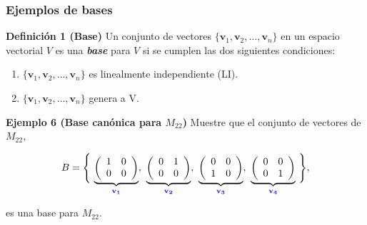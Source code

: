 {\nologo
\begin{frame}\frametitle{Ejemplos de bases}

\begin{block}{\textbf{Definición 1 (Base)}}
	\justifying
	Un conjunto de vectores $\{\mathbf{v}_1, \mathbf{v}_2, \hdots , \mathbf{v}_n \}$ en un espacio vectorial $V$ es 
	una \textbf{\textit{base}} para $V$ si se cumplen las dos siguientes condiciones:
	\begin{enumerate}
		\item[\labelname{$a$}] $\{\mathbf{v}_1, \mathbf{v}_2, \hdots , \mathbf{v}_n \}$ es linealmente independiente (LI).
		\item[\labelname{$b$}] $\{\mathbf{v}_1, \mathbf{v}_2, \hdots , \mathbf{v}_n \}$ genera a V.
	\end{enumerate}
\end{block}


\begin{ej}{\textbf{Ejemplo 6 (Base canónica para $M_{22}$)}} \justifying
	Muestre que el conjunto de vectores de $M_{22}$,
	
	\vspace{-2mm}
	\[
	B = \Bigg\{ \, \underbrace{ \left( \begin{array}{cc}	1 & 0 \\ 0 & 0 \end{array} \right) }_{\color{blue}\mathbf{v_1}}, \ \underbrace{  \left( \begin{array}{cc}	0 & 1 \\ 0 & 0 \end{array} \right) }_{\color{blue}\mathbf{v_2}}, \ 
	\underbrace{ \left( \begin{array}{rr}  0 & 0 \\ 1 & 0 \end{array} \right) }_{\color{blue}\mathbf{v_3}}, \ 
	\underbrace{ \left( \begin{array}{rr}  0 & 0 \\ 0 & 1 \end{array} \right) }_{\color{blue}\mathbf{v_4}} \, \Bigg\},
	\]
	
	\vspace{-2mm}
	es una base para $M_{22}$.
\end{ej}	

\end{frame}
}


